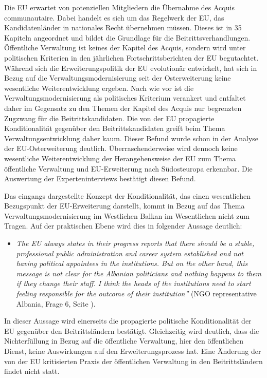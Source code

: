 Die EU erwartet von potenziellen Mitgliedern die Übernahme des Acquis communautaire. Dabei handelt es sich um das Regelwerk der EU, das Kandidatenländer in nationales Recht übernehmen müssen. Dieses ist in 35 Kapiteln angeordnet und bildet die Grundlage für die Beitrittsverhandlungen. Öffentliche Verwaltung ist keines der Kapitel des Acquis, sondern wird unter politischen Kriterien in den jährlichen Fortschrittsberichten der EU begutachtet. Während sich die Erweiterungspolitik der EU evolutionär entwickelt, hat sich in Bezug auf die Verwaltungsmodernisierung seit der Osterweiterung keine wesentliche Weiterentwicklung ergeben. Nach wie vor ist die Verwaltungsmodernisierung als politisches Kriterium verankert und entfaltet daher im Gegensatz zu den Themen der Kapitel des Acquis nur begrenzten Zugzwang für die Beitrittskandidaten. Die von der EU propagierte Konditionalität gegenüber den Beitrittskandidaten greift beim Thema Verwaltungsentwicklung daher kaum. Dieser Befund wurde schon in der Analyse der EU-Osterweiterung deutlich. Überraschenderweise wird dennoch keine wesentliche Weiterentwicklung der Herangehensweise der EU zum Thema öffentliche Verwaltung und EU-Erweiterung nach Südosteuropa erkennbar. Die Auswertung der Experteninterviews bestätigt diesen Befund.\par
Das eingangs dargestellte Konzept der Konditionalität, das einen wesentlichen Bezugspunkt der EU-Erweiterung darstellt, kommt in Bezug auf das Thema Verwaltungsmodernisierung im Westlichen Balkan im Wesentlichen nicht zum Tragen. Auf der praktischen Ebene wird dies in folgender Aussage deutlich:
\begin{itemize}[label={}]
\item \textit{The EU always states in their progress reports that there should be a stable, professional public administration and career system established and not having political appointees in the institutions. But on the other hand, this message is not clear for the Albanian politicians and nothing happens to them if they change their staff. I think the heads of the institutions need to start feeling responsible for the outcome of their institution”} (NGO representative Albania, Frage 6, Seite \pageref{sec:par view}).
\end{itemize}
In dieser Aussage wird einerseits die propagierte politische Konditionalität der EU gegenüber den Beitrittsländern bestätigt. Gleichzeitig wird deutlich, dass die Nichterfüllung in Bezug auf die öffentliche Verwaltung, hier den öffentlichen Dienst, keine Auswirkungen auf den Erweiterungsprozess hat. Eine Änderung der von der EU kritisierten Praxis der öffentlichen Verwaltung in den Beitrittsländern findet nicht statt.\par
